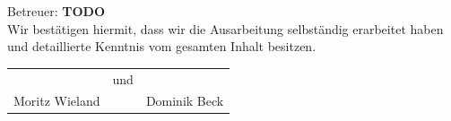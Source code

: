 \documentclass[11pt]{betterallrounder}
\begin{document}
\begin{titlepage}
\begin{center}
        {\large Betreuer: \bfseries{TODO}}\\[1cm]

        {\large Wir bestätigen hiermit, dass wir die Ausarbeitung selbständig erarbeitet haben und
        detaillierte Kenntnis vom gesamten Inhalt besitzen.}\\[1cm]

        \begin{tabular}{rcl}
            \hrulefill & und & \hrulefill\\
            Moritz Wieland & & Dominik Beck
        \end{tabular}
    
        \vfill
    \end{center}
\end{titlepage}


\newpage

\tableofcontents




% 
% 
\end{document}
